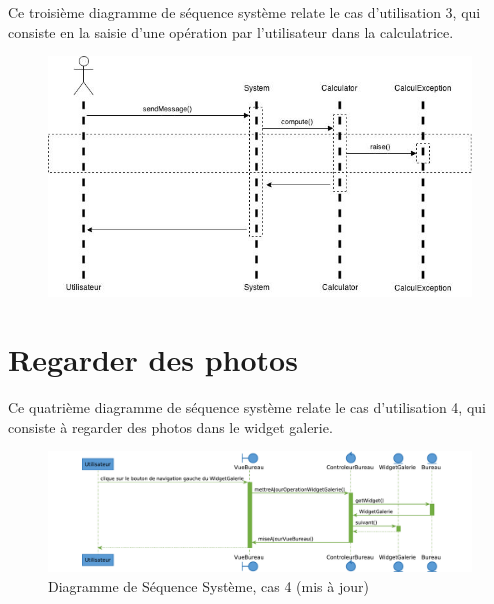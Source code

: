 \section{\color{red}{Saisir une opération (Supprimmé)}}

\color{red}{}Ce troisième diagramme de séquence système relate le cas d'utilisation
3, qui consiste en la saisie d'une opération par l'utilisateur dans la 
calculatrice.\color{black}

\begin{figure}[h!]
	\centering
	\includegraphics[scale=0.4]{diagrammes/DSS3.jpg}
	\caption{\color{red}{Diagramme de Séquence Système, cas 3}}
\end{figure}

\section{Regarder des photos}

Ce quatrième diagramme de séquence système relate le cas d'utilisation
4, qui consiste à regarder des photos dans le widget galerie.

\begin{figure}[h!]
	\centering
	\includegraphics[scale=0.48]{diagrammes/dss4.pdf}
	\caption{\color{green}Diagramme de Séquence Système, cas 4 (mis à jour)\color{black}}
\end{figure}
\newpage

